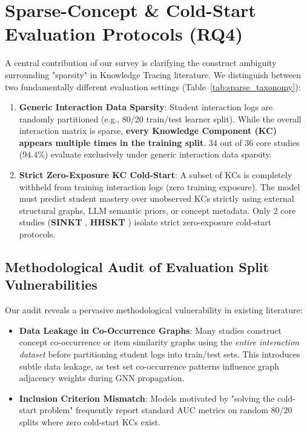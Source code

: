 \documentclass[10pt,journal,compsoc]{IEEEtran}
\begin{document}
\section{Sparse-Concept \& Cold-Start Evaluation Protocols (RQ4)}

A central contribution of our survey is clarifying the construct ambiguity surrounding "sparsity" in Knowledge Tracing literature. We distinguish between two fundamentally different evaluation settings (Table~\ref{tab:sparse_taxonomy}):
\begin{enumerate}
    \item \textbf{Generic Interaction Data Sparsity}: Student interaction logs are randomly partitioned (e.g., 80/20 train/test learner split). While the overall interaction matrix is sparse, \textbf{every Knowledge Component (KC) appears multiple times in the training split}. 34 out of 36 core studies (94.4\%) evaluate exclusively under generic interaction data sparsity.
    \item \textbf{Strict Zero-Exposure KC Cold-Start}: A subset of KCs is completely withheld from training interaction logs (zero training exposure). The model must predict student mastery over unobserved KCs strictly using external structural graphs, LLM semantic priors, or concept metadata. Only 2 core studies (\textbf{SINKT} \cite{KT044_SINKT_2024}, \textbf{HHSKT} \cite{KT035_HHSKT_2023}) isolate strict zero-exposure cold-start protocols.
\end{enumerate}

\subsection{Methodological Audit of Evaluation Split Vulnerabilities}
Our audit reveals a pervasive methodological vulnerability in existing literature:
\begin{itemize}
    \item \textbf{Data Leakage in Co-Occurrence Graphs}: Many studies construct concept co-occurrence or item similarity graphs using the \emph{entire interaction dataset} before partitioning student logs into train/test sets. This introduces subtle data leakage, as test set co-occurrence patterns influence graph adjacency weights during GNN propagation.
    \item \textbf{Inclusion Criterion Mismatch}: Models motivated by "solving the cold-start problem" frequently report standard AUC metrics on random 80/20 splits where zero cold-start KCs exist.
\end{itemize}
\end{document}
